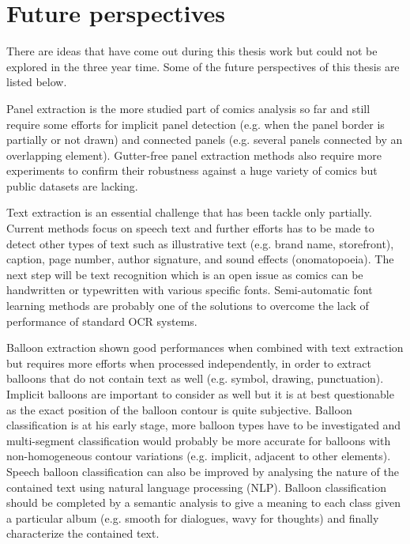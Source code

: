 \section{Future perspectives}
\label{conclusions:perspectives}

There are ideas that have come out during this thesis work but could not be explored in the three year time.
Some of the future perspectives of this thesis are listed below.

Panel extraction is the more studied part of comics analysis so far and still require some efforts for implicit panel detection (e.g. when the panel border is partially or not drawn) and connected panels (e.g. several panels connected by an overlapping element).
Gutter-free panel extraction methods also require more experiments to confirm their robustness against a huge variety of comics but public datasets are lacking.

Text extraction is an essential challenge that has been tackle only partially.
Current methods focus on speech text and further efforts has to be made to detect other types of text such as illustrative text (e.g. brand name, storefront), caption, page number, author signature, and sound effects (onomatopoeia).
The next step will be text recognition which is an open issue as comics can be handwritten or typewritten with various specific fonts.
Semi-automatic font learning methods are probably one of the solutions to overcome the lack of performance of standard OCR systems. 

Balloon extraction shown good performances when combined with text extraction but requires more efforts when processed independently, in order to extract balloons that do not contain text as well (e.g. symbol, drawing, punctuation).
Implicit balloons are important to consider as well but it is at best questionable as the exact position of the balloon contour is quite subjective.
Balloon classification is at his early stage, more balloon types have to be investigated and multi-segment classification would probably be more accurate for balloons with non-homogeneous contour variations (e.g. implicit, adjacent to other elements). 
Speech balloon classification can also be improved by analysing the nature of the contained text using natural language processing (NLP).
Balloon classification should be completed by a semantic analysis to give a meaning to each class given a particular album (e.g. smooth for dialogues, wavy for thoughts) and finally characterize the contained text.

